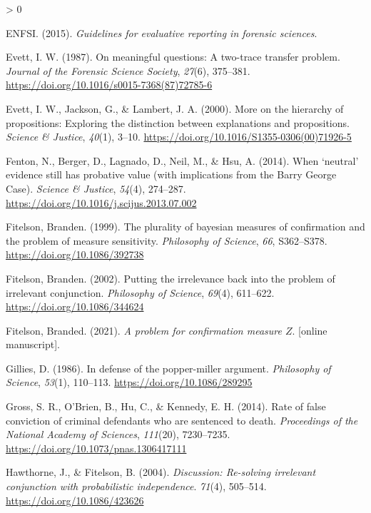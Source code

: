 \documentclass[
  10pt,
  dvipsnames,enabledeprecatedfontcommands]{scrartcl}
\newlength{\cslhangindent}
\newenvironment{CSLReferences}[2] %
 {%
  \setlength{\parindent}{0pt}
  \ifodd #1 \everypar{\setlength{\hangindent}{\cslhangindent}}\ignorespaces\fi
  \ifnum #2 > 0
  \setlength{\parskip}{#2\baselineskip}
  \fi
 }%
 {}
\begin{document}
\begin{CSLReferences}{1}{0}
\leavevmode\hypertarget{ref-enfs2015}{}%
ENFSI. (2015). \emph{Guidelines for evaluative reporting in forensic
sciences}.

\leavevmode\hypertarget{ref-Evett1987}{}%
Evett, I. W. (1987). On meaningful questions: A two-trace transfer
problem. \emph{Journal of the Forensic Science Society}, \emph{27}(6),
375--381. \url{https://doi.org/10.1016/s0015-7368(87)72785-6}

\leavevmode\hypertarget{ref-evett2000MoreHierarchyPropositions}{}%
Evett, I. W., Jackson, G., \& Lambert, J. A. (2000). More on the
hierarchy of propositions: Exploring the distinction between
explanations and propositions. \emph{Science \& Justice}, \emph{40}(1),
3--10. \url{https://doi.org/10.1016/S1355-0306(00)71926-5}

\leavevmode\hypertarget{ref-fenton2014WhenNeutralEvidence}{}%
Fenton, N., Berger, D., Lagnado, D., Neil, M., \& Hsu, A. (2014). When
{`neutral'} evidence still has probative value (with implications from
the {Barry George Case}). \emph{Science \& Justice}, \emph{54}(4),
274--287. \url{https://doi.org/10.1016/j.scijus.2013.07.002}

\leavevmode\hypertarget{ref-Fitelson1999plurality}{}%
Fitelson, Branden. (1999). The plurality of bayesian measures of
confirmation and the problem of measure sensitivity. \emph{Philosophy of
Science}, \emph{66}, S362--S378. \url{https://doi.org/10.1086/392738}

\leavevmode\hypertarget{ref-Fitelson2002irrelevance}{}%
Fitelson, Branden. (2002). Putting the irrelevance back into the problem
of irrelevant conjunction. \emph{Philosophy of Science}, \emph{69}(4),
611--622. \url{https://doi.org/10.1086/344624}

\leavevmode\hypertarget{ref-Fitelson2021z_measure}{}%
Fitelson, Branded. (2021). \emph{A problem for confirmation measure
\(Z\)}. {[}online manuscript{]}.

\leavevmode\hypertarget{ref-Gillies1986defense}{}%
Gillies, D. (1986). In defense of the popper-miller argument.
\emph{Philosophy of Science}, \emph{53}(1), 110--113.
\url{https://doi.org/10.1086/289295}

\leavevmode\hypertarget{ref-gross2014RateFalseConviction}{}%
Gross, S. R., O'Brien, B., Hu, C., \& Kennedy, E. H. (2014). Rate of
false conviction of criminal defendants who are sentenced to death.
\emph{Proceedings of the National Academy of Sciences}, \emph{111}(20),
7230--7235. \url{https://doi.org/10.1073/pnas.1306417111}

\leavevmode\hypertarget{ref-HawthorneFitelson2004re-solving}{}%
Hawthorne, J., \& Fitelson, B. (2004). \emph{Discussion: Re-solving
irrelevant conjunction with probabilistic independence}. \emph{71}(4),
505--514. \url{https://doi.org/10.1086/423626}


\end{CSLReferences}
\end{document}
